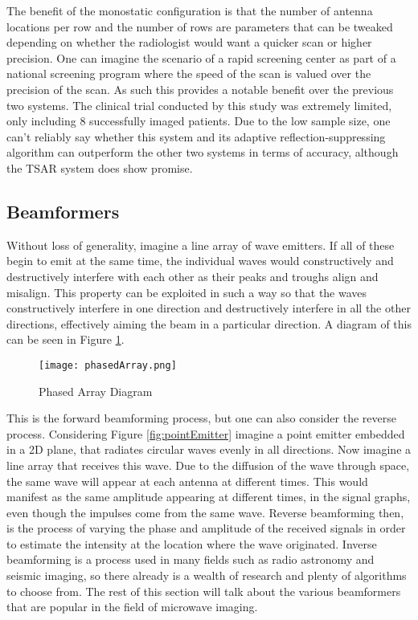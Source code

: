 The benefit of the monostatic configuration is that the number of antenna locations per row and the number of rows are
parameters that can be tweaked depending on whether the radiologist would want a quicker scan or higher precision. One
can imagine the scenario of a rapid screening center as part of a national screening program where the speed of the scan
is valued over the precision of the scan. As such this provides a notable benefit over the previous two systems. The
clinical trial conducted by this study was extremely limited, only including 8 successfully imaged patients. Due to the
low sample size, one can't reliably say whether this system and its adaptive reflection-suppressing algorithm can
outperform the other two systems in terms of accuracy, although the TSAR system does show promise. \hfill 

\subsection{Beamformers}
Without loss of generality, imagine a line array of wave emitters. If all of these begin to emit at the same time, the
individual waves would constructively and destructively interfere with each other as their peaks and troughs align and
misalign. This property can be exploited in such a way so that the waves constructively interfere in one direction and
destructively interfere in all the other directions, effectively aiming the beam in a particular direction. A diagram
of this can be seen in Figure \ref{fig:phasedArray}.


\begin{figure}[!h]
    \texttt{[image: phasedArray.png]}
    \centering
    \caption{Phased Array Diagram}
    \label{fig:phasedArray}
\end{figure}

This is the forward beamforming process, but one can also consider the reverse process. Considering Figure \ref{fig:pointEmitter} imagine a point emitter
embedded in a 2D plane, that radiates circular waves evenly in all directions. Now imagine a line array that receives
this wave. Due to the diffusion of the wave through space, the same wave will appear at each antenna at different times. This would
manifest as the same amplitude appearing at different times, in the signal graphs, even though the impulses come from
the same wave. Reverse beamforming then, is the process of varying the phase and amplitude of the received signals in
order to estimate the intensity at the location where the wave originated. Inverse beamforming is a process used in many
fields such as radio astronomy and seismic imaging, so there already is a wealth of research and plenty of algorithms to
choose from. The rest of this section will talk about the various beamformers that are popular in the field of microwave
imaging. \hfill \break

